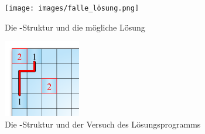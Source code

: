 \begin{figure}
    \begin{center}
        \texttt{[image: images/falle\_lösung.png]}
        \caption{Die \grqq-Struktur und die mögliche Lösung}
        \label{abb:bild1}
    \end{center}
\end{figure}

\begin{figure}
    \begin{center}
        \includegraphics[width=0.3\textwidth]{images/falle_versuch.png}
        \caption{Die \grqq-Struktur und der Versuch des Lösungsprogramms}
        \label{abb:bild2}
    \end{center}
\end{figure}

